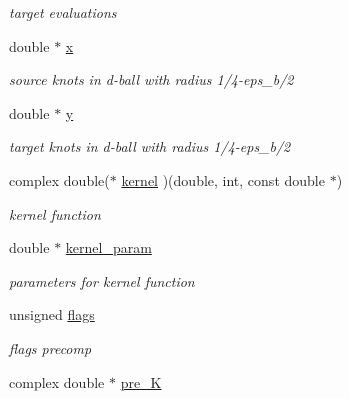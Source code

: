 \begin{CompactItemize}
\begin{CompactList}\small\item\em target evaluations \item\end{CompactList}\item 
\hypertarget{structfastsum__plan___o5}{
double $\ast$ \hyperlink{structfastsum__plan___o5}{x}}
\label{structfastsum__plan___o5}

\begin{CompactList}\small\item\em source knots in d-ball with radius 1/4-eps\_\-b/2 \item\end{CompactList}\item 
\hypertarget{structfastsum__plan___o6}{
double $\ast$ \hyperlink{structfastsum__plan___o6}{y}}
\label{structfastsum__plan___o6}

\begin{CompactList}\small\item\em target knots in d-ball with radius 1/4-eps\_\-b/2 \item\end{CompactList}\item 
\hypertarget{structfastsum__plan___o7}{
complex double($\ast$ \hyperlink{structfastsum__plan___o7}{kernel} )(double, int, const double $\ast$)}
\label{structfastsum__plan___o7}

\begin{CompactList}\small\item\em kernel function \item\end{CompactList}\item 
\hypertarget{structfastsum__plan___o8}{
double $\ast$ \hyperlink{structfastsum__plan___o8}{kernel\_\-param}}
\label{structfastsum__plan___o8}

\begin{CompactList}\small\item\em parameters for kernel function \item\end{CompactList}\item 
unsigned \hyperlink{structfastsum__plan___o9}{flags}
\begin{CompactList}\small\item\em flags precomp \item\end{CompactList}\item 
\hypertarget{structfastsum__plan___o10}{
complex double $\ast$ \hyperlink{structfastsum__plan___o10}{pre\_\-K}}
\label{structfastsum__plan___o10}


\end{CompactItemize}
